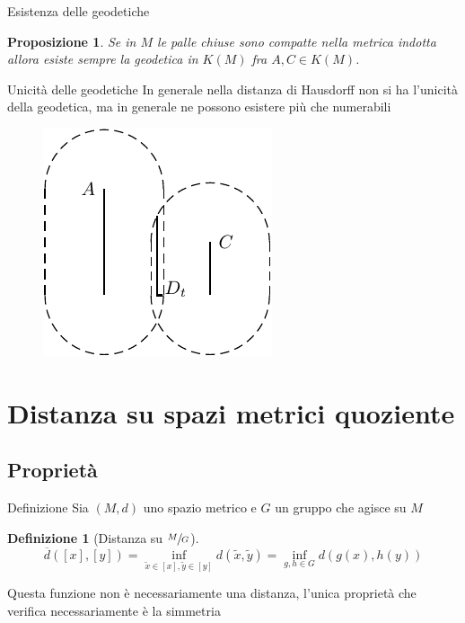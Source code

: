 \documentclass{beamer}
\newcounter{counter1}
\theoremstyle{plain}
\newtheorem{mylem}[counter1]{Lemma}
\newtheorem{mypro}[counter1]{Proposizione}
\theoremstyle{definition}
\newtheorem{mydef}[counter1]{Definizione}
\theoremstyle{remark}
\newcommand{\obar}[1]{\overline{#1}}
\newcommand{\bra}[1]{\left[#1\right]}
\begin{document}
\begin{frame}{Esistenza delle geodetiche}
  \begin{mypro}
    Se in $M$ le palle chiuse sono compatte nella metrica indotta
    allora esiste sempre la geodetica in $K(M)$ fra $A,C \in K(M)$.
  \end{mypro}
\end{frame}
\begin{frame}{Unicità delle geodetiche}
  In generale nella distanza di Hausdorff non si ha l'unicità della
  geodetica, ma in generale ne possono esistere più che numerabili
  \begin{figure}[h]
    \includegraphics[scale=1]{geodetichehausdorff.pdf}
  \end{figure}
\end{frame}

\section{Distanza su spazi metrici quoziente}

\subsection{Proprietà}

\begin{frame}{Definizione}
  Sia $(M,d)$ uno spazio metrico e $G$ un gruppo che agisce su $M$
  \begin{mydef}[Distanza su $\sfrac{M}{G}$]
    \[ \obar d (\bra{x}, \bra{y}) = \inf _{\tilde x \in \bra{x} ,
      \tilde y \in \bra {y}} d(\tilde x , \tilde y) = \inf _ {g,h \in
      G} d(g(x), h(y)) \]
  \end{mydef}

  Questa funzione non è necessariamente una distanza, l'unica
  proprietà che verifica necessariamente è la simmetria
\end{frame}
\end{document}
